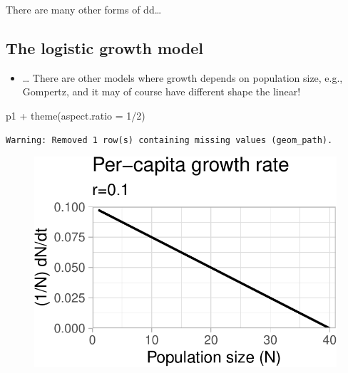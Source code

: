 \documentclass[
  letterpaper,
  DIV=11,
  numbers=noendperiod]{scrartcl}
\newenvironment{Shaded}{\begin{snugshade}}{\end{snugshade}}
\newcommand{\AttributeTok}[1]{\textcolor[rgb]{0.40,0.45,0.13}{#1}}
\newcommand{\DecValTok}[1]{\textcolor[rgb]{0.68,0.00,0.00}{#1}}
\newcommand{\FunctionTok}[1]{\textcolor[rgb]{0.28,0.35,0.67}{#1}}
\newcommand{\NormalTok}[1]{\textcolor[rgb]{0.00,0.23,0.31}{#1}}
\newcommand{\SpecialCharTok}[1]{\textcolor[rgb]{0.37,0.37,0.37}{#1}}
\providecommand{\tightlist}{%
  \setlength{\itemsep}{0pt}\setlength{\parskip}{0pt}}\usepackage{longtable,booktabs,array}
\begin{document}
There are many other forms of dd\ldots{}

\hypertarget{the-logistic-growth-model-12}{%
\subsection{The logistic growth
model}\label{the-logistic-growth-model-12}}

\begin{itemize}
\tightlist
\item
  \ldots{} There are other models where growth depends on population
  size, e.g., Gompertz, and it may of course have different shape the
  linear!
\end{itemize}

\begin{Shaded}
\begin{Highlighting}[]
\NormalTok{p1 }\SpecialCharTok{+} \FunctionTok{theme}\NormalTok{(}\AttributeTok{aspect.ratio =} \DecValTok{1}\SpecialCharTok{/}\DecValTok{2}\NormalTok{)}
\end{Highlighting}
\end{Shaded}

\begin{verbatim}
Warning: Removed 1 row(s) containing missing values (geom_path).
\end{verbatim}

\begin{figure}[H]

{\centering \includegraphics{ecological_interactions_files/figure-pdf/unnamed-chunk-10-1.pdf}

}

\end{figure}
\end{document}
